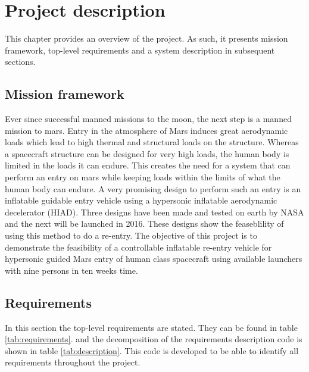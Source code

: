 \section{Project description}\label{cha:project_description}%
This chapter provides an overview of the project. As such, it presents mission framework, top-level requirements and a system description in subsequent sections.

\subsection{Mission framework}
Ever since successful manned missions to the moon, the next step is a manned mission to mars. Entry in the atmosphere of Mars induces great aerodynamic loads which lead to high thermal and structural loads on the structure. Whereas a spacecraft structure can be designed for very high loads, the human body is limited in the loads it can endure. This creates the need for a system that can perform an entry on mars while keeping loads within the limits of what the human body can endure. A very promising design to perform such an entry is an inflatable guidable entry vehicle using a hypersonic inflatable aerodynamic decelerator (HIAD). Three designs have been made and tested on earth by NASA and the next will be launched in 2016. \cite{irve,irve2,irve3,thor} These designs show the feaseblility of using this method to do a re-entry. The objective of this project is to demonstrate the feasibility of a controllable inflatable re-entry vehicle for hypersonic guided Mars entry of human class spacecraft using available launchers with nine persons in ten weeks time.

\subsection{Requirements}
In this section the top-level requirements are stated. They can be found in table \ref{tab:requirements}. and the decomposition of the requirements description code is shown in table \ref{tab:description}. This code is developed to be able to identify all requirements throughout the project.

